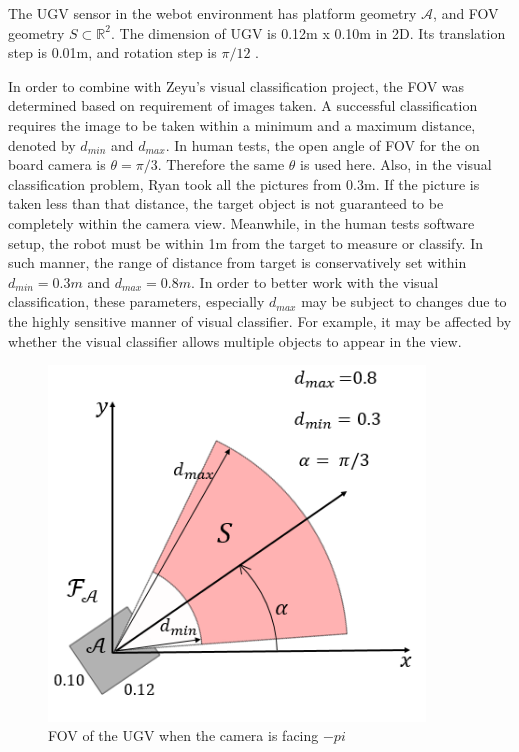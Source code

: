 \documentclass[12pt,draftcls,onecolumn]{IEEEtran}
\begin{document}
The UGV sensor in the webot environment has platform geometry $\mathcal{A}$, and FOV geometry $S \subset \mathbb{R}^2 $. 
The dimension of UGV is 0.12m x 0.10m in 2D.
Its translation step is 0.01m, and rotation step is $\pi/12$ .



In order to combine with Zeyu's visual classification project, the FOV was determined based on requirement of  images taken. 
A successful classification requires the image to be taken within a minimum and a maximum distance, denoted by $d_{min}$ and  $d_{max}$. 
In human tests, the open angle of FOV for the on board camera is $\theta =\pi/3 $. 
Therefore the same  $\theta$ is used here.
Also, in the visual classification problem, Ryan took all the pictures from 0.3m.
If the picture is taken less than that distance, the target object is not guaranteed to be completely within the camera view.
Meanwhile, in the human tests software setup, the robot must be within 1m from the target to  measure or classify.
In such manner, the range of distance from target is conservatively set within $d_{min} = 0.3m$ and  $d_{max}=0.8 m$.
In order to better work with the visual classification, these parameters, especially $d_{max}$ may be subject to changes due to the highly sensitive manner of visual classifier. 
For example, it may be affected by whether the visual classifier allows multiple objects to appear in the view. 

\begin{figure}
 \centering
  \includegraphics[width=10cm]{figures/FOV}
  \caption{FOV of the UGV when the camera is facing $-pi$}
  \label{fig:boat1}
\end{figure}
\end{document}
